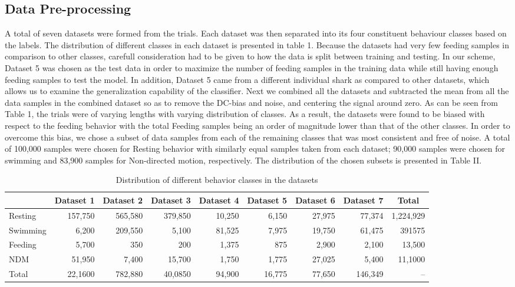 \documentclass[conference]{IEEEtran}
\begin{document}
\subsection{Data Pre-processing}
A total of seven datasets were formed from the trials. Each dataset was then separated into its four constituent behaviour classes based on the labels. The distribution of different classes in each dataset is presented in table 1. Because the datasets had very few feeding samples in comparison to other classes, carefull consideration had to be given to how the data is split between training and testing. In our scheme, Dataset 5 was chosen as the test data in order to maximize the number of feeding samples in the training data while still having enough feeding samples to test the model.  In addition, Dataset 5 came from a different individual shark as compared to other datasets, which allows us to examine the generalization capability of the classifier.
Next we combined all the datasets and subtracted the mean from all the data samples in the combined dataset so as to remove the DC-bias and noise, and centering the signal around zero. 
As can be seen from Table 1, the trials were of varying lengths with varying distribution of classes. As a result, the datasets were found to be biased with respect to the feeding behavior with the total Feeding samples being an order of magnitude lower than that of the other classes. In order to overcome this bias, we chose a subset of data samples from each of the remaining classes that was most consistent and free of noise. A total of 100,000 samples were chosen for Resting behavior with similarly equal samples taken from each dataset; 90,000 samples were chosen for swimming and 83,900 samples for Non-directed motion, respectively. The distribution of the chosen subsets is presented in Table II.
\begin{table}[tp!]
	\centering
	\caption{Distribution of different behavior classes in the datasets}
	\begin{tabular}{l r r r r r r r r}
	\hline
	& \textbf{Dataset 1} & \textbf{Dataset 2} & \textbf{Dataset 3} & \textbf{Dataset 4} & \textbf{Dataset 5} & \textbf{Dataset 6} & \textbf{Dataset 7} & \multicolumn{1}{c}{\textbf{Total}}\\
	\hline
	Resting & 157,750 & 565,580 & 379,850 & 10,250 & 6,150 & 27,975 & 77,374 & 1,224,929 \\
	Swimming & 6,200 & 209,550 & 5,100 & 81,525 & 7,975 & 19,750 & 61,475 & 391575 \\
	Feeding & 5,700 & 350 & 200 & 1,375 & 875 & 2,900 & 2,100 & 13,500 \\
	NDM & 51,950 & 7,400 & 15,700 & 1,750 & 1,775 & 27,025 & 5,400 & 11,1000 \\
	Total & 22,1600 & 782,880 & 40,0850 & 94,900 & 16,775 & 77,650 & 146,349 & -- \\
	\hline
	\end{tabular}
	\label{}
\end{table}
\end{document}
